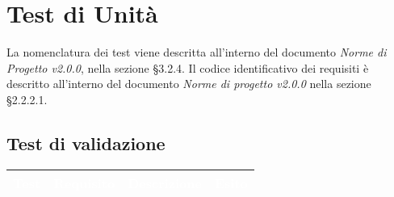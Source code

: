 \section{Test di Unità}
\label{test_u}

La nomenclatura dei test viene descritta all'interno del documento \textit{Norme di Progetto v2.0.0}, nella sezione §3.2.4. Il codice identificativo dei requisiti è descritto all'interno del documento \textit{Norme di progetto v2.0.0} nella sezione §2.2.2.1.

\subsection{Test di validazione}

\begin{longtable}{|C{.15\textwidth}|C{.13\textwidth}|m{.52\textwidth}|C{.08\textwidth}|}
\hline
{}\textbf{\textcolor{white}{Test}} & \textbf{\textcolor{white}{Requisito}} & \textbf{\textcolor{white}{Descrizione}} & \textbf{\textcolor{white}{Esito}}\\
\hline \hline
\endhead


\end{longtable}
